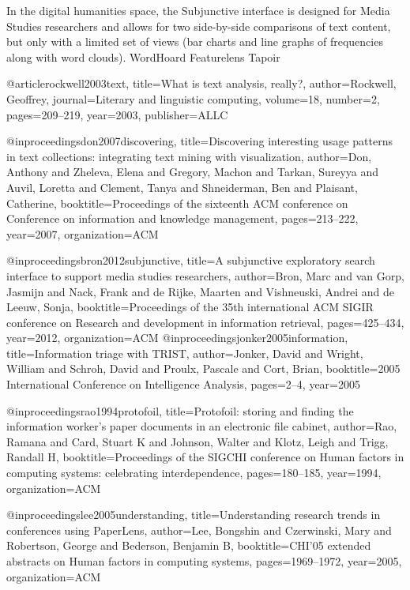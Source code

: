 In the digital humanities space, the Subjunctive interface \cite{bron2012subjunctive} is designed for Media Studies researchers and allows for two side-by-side comparisons of text content, but only with a limited set of views (bar charts and line graphs of frequencies along with word clouds).  WordHoard \cite{} 
Featurelens \cite{don2007discovering}
Tapoir \cite{rockwell2003text}



@article{rockwell2003text,
  title={What is text analysis, really?},
  author={Rockwell, Geoffrey},
  journal={Literary and linguistic computing},
  volume={18},
  number={2},
  pages={209--219},
  year={2003},
  publisher={ALLC}
}

@inproceedings{don2007discovering,
  title={Discovering interesting usage patterns in text collections: integrating text mining with visualization},
  author={Don, Anthony and Zheleva, Elena and Gregory, Machon and Tarkan, Sureyya and Auvil, Loretta and Clement, Tanya and Shneiderman, Ben and Plaisant, Catherine},
  booktitle={Proceedings of the sixteenth ACM conference on Conference on information and knowledge management},
  pages={213--222},
  year={2007},
  organization={ACM}
}

@inproceedings{bron2012subjunctive,
  title={A subjunctive exploratory search interface to support media studies researchers},
  author={Bron, Marc and van Gorp, Jasmijn and Nack, Frank and de Rijke, Maarten and Vishneuski, Andrei and de Leeuw, Sonja},
  booktitle={Proceedings of the 35th international ACM SIGIR conference on Research and development in information retrieval},
  pages={425--434},
  year={2012},
  organization={ACM}
}
@inproceedings{jonker2005information,
  title={Information triage with TRIST},
  author={Jonker, David and Wright, William and Schroh, David and Proulx, Pascale and Cort, Brian},
  booktitle={2005 International Conference on Intelligence Analysis},
  pages={2--4},
  year={2005}
}

@inproceedings{rao1994protofoil,
  title={Protofoil: storing and finding the information worker's paper documents in an electronic file cabinet},
  author={Rao, Ramana and Card, Stuart K and Johnson, Walter and Klotz, Leigh and Trigg, Randall H},
  booktitle={Proceedings of the SIGCHI conference on Human factors in computing systems: celebrating interdependence},
  pages={180--185},
  year={1994},
  organization={ACM}
}

@inproceedings{lee2005understanding,
  title={Understanding research trends in conferences using PaperLens},
  author={Lee, Bongshin and Czerwinski, Mary and Robertson, George and Bederson, Benjamin B},
  booktitle={CHI'05 extended abstracts on Human factors in computing systems},
  pages={1969--1972},
  year={2005},
  organization={ACM}
}

